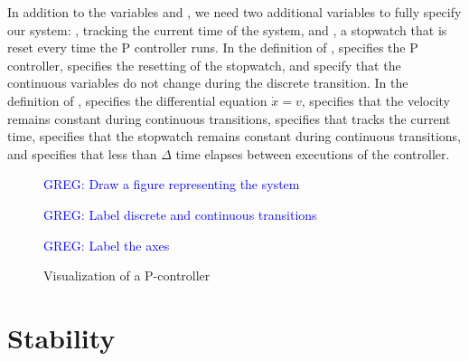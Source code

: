\documentclass[preprint,nocopyrightspace]{sigplanconf}
\newcommand{\greg}[1]{\textcolor{blue}{\textsc{GREG}: #1}}
\begin{document}
In addition to the variables  and , we need two additional variables to fully specify our system: , tracking the current time of the system, and , a stopwatch that is reset every time the P controller runs.
In the definition of ,  specifies the P controller,  specifies the resetting of the stopwatch, and  specify that the continuous variables do not change during the discrete transition.
In the definition of ,  specifies the differential equation $\dot{x} = v$,  specifies that the velocity remains constant during continuous transitions,  specifies that  tracks the current time,  specifies that the stopwatch remains constant during continuous transitions, and  specifies that less than $\Delta$ time elapses between executions of the controller.

\begin{figure}

\greg{Draw a figure representing the system}

\greg{Label discrete and continuous transitions}

\greg{Label the axes}


\scalebox{0.6}{}

\caption{Visualization of a P-controller}
\label{fig:system-visualization}
\end{figure}







\section{Stability}
\end{document}
